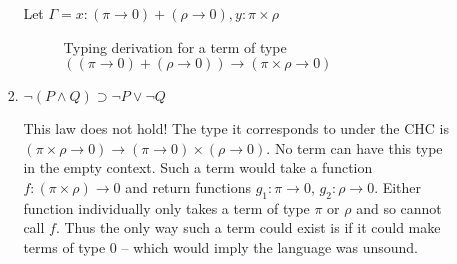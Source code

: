 \documentclass[10pt,\jkfside,a4paper]{article}
\begin{document}
\begin{enumerate}
\begin{enumerate}
\begin{enumerate}
            Let $\Gamma = x: (\pi \to 0) + (\rho \to 0), y: \pi \times \rho$

            \begin{sidewaysfigure}

                \centering

                \begin{prooftree}
                \end{prooftree}

                \caption{Typing derivation for a term of type $((\pi \to 0) + (\rho \to 0)) \to (\pi \times \rho \to 0)$}

            \end{sidewaysfigure}

            \item $\neg (P \land Q) \supset \neg P \vee \neg Q$

            This law does not hold! The type it corresponds to under the CHC is $(\pi \times \rho \to 0) \to (\pi \to 0) \times (\rho \to 0)$. No term can have this type in the empty context. Such a term
            would take a function $f: (\pi \times \rho) \to 0$ and return functions $g_1: \pi \to 0$, $g_2: \rho \to 0$. Either function individually only takes a term of type $\pi$ or $\rho$ and so cannot call
            $f$. Thus the only way such a term could exist is if it could make terms of type $0$ -- which would imply the language was unsound.


\end{enumerate}
\end{enumerate}
\end{enumerate}
\end{document}

